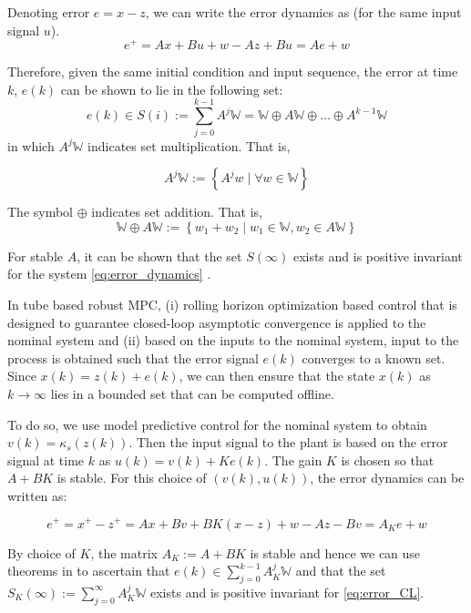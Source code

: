 \documentclass[10pt]{article}
\newcommand{\set}[1]{\left\lbrace #1 \right\rbrace}
\theoremstyle{definition}
\begin{document}
Denoting error $e = x-z$, we can write the error dynamics as (for the same input signal $u$). 
\begin{equation}
\label{eq:error_dynamics}
e^+ = Ax+Bu+w - Az+Bu = Ae + w
\end{equation}

Therefore, given the same initial condition and input sequence, the error at time $k$, $e(k)$ can be shown to lie in the following set:
\begin{equation}
\label{eq:error_set}
e(k) \in S(i) :=\sum_{j=0}^{k-1}A^j\mathbb{W} = \mathbb{W} \oplus A\mathbb{W}
\oplus \ldots \oplus A^{k-1}\mathbb{W}
\end{equation}
in which $A^j\mathbb{W}$ indicates set multiplication. That is,

\[A^j\mathbb{W} := \set{A^jw \mid \forall w \in \mathbb{W}}
\]

The symbol $\oplus$ indicates set addition. That is,
\[ \mathbb{W} \oplus A\mathbb{W} := \set{w_1+w_2 \mid w_1 \in
  \mathbb{W}, w_2 \in A\mathbb{W}}\]

For stable $A$, it can be shown that the set $S(\infty)$ exists and is
positive invariant for the system \eqref{eq:error_dynamics}
\citep{kolmanovsky:gilbert:1998}.

In tube based robust MPC, (i) rolling horizon optimization based control that is designed to guarantee closed-loop asymptotic convergence is applied to the nominal system and (ii) based on the inputs to the nominal system, input to the process is obtained such that the error signal $e(k)$ converges to a known set. Since $x(k) = z(k) + e(k)$, we can then ensure that the state $x(k)$ as $k \rightarrow \infty$ lies in a bounded set that can be computed offline.  

To do so, we use model predictive control for the nominal system to obtain $v(k) = \kappa_s(z(k))$. Then the input signal to the plant is based on the error signal at time $k$ as $ u(k) = v(k) + Ke(k)$. The gain $K$ is chosen so that $A+BK$ is stable. For this choice of $(v(k),u(k))$, the error dynamics can be written as:

\begin{equation}
\label{eq:error_CL}
e^+ = x^+-z^+=Ax+Bv+BK(x-z)+w-Az-Bv = A_Ke+w
\end{equation}

By choice of $K$, the matrix $A_K:= A+BK$ is stable and hence we can use theorems in \citep{kolmanovsky:gilbert:1998} to ascertain that $e(k) \in \sum_{j=0}^{k-1}A_K^j\mathbb{W}$ and that the set $S_K(\infty) := \sum_{j=0}^{\infty}A_K^j\mathbb{W}$ exists and is positive invariant for \eqref{eq:error_CL}.
\end{document}
